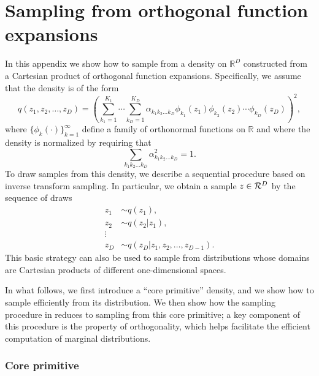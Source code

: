 
%

\section{Sampling from orthogonal function expansions}
\label{app:sampling}

In this appendix we show how to sample from a density on $\mathbb{R}^D$ constructed from a Cartesian product of orthogonal function expansions. Specifically, we assume that the density is of the form
\begin{equation}
    q(z_1,z_2,\ldots,z_D) = \left(\sum_{k_1=1}^{K_1} \cdots \sum_{k_D=1}^{K_D} \alpha_{k_1 k_2 \ldots k_D}\phi_{k_1}(z_1)\phi_{k_2}(z_2)\cdots\phi_{k_D}(z_D)\right)^2,
\end{equation}
where $\{\phi_{k}(\cdot)\}_{k=1}^\infty$ define a family of orthonormal functions on $\mathbb{R}$ and where the density is normalized by requiring that
\begin{equation}
\sum_{k_1 k_2\ldots k_D} \alpha_{k_1 k_2\ldots k_D}^2=1.
\end{equation}
To draw samples from this density, we describe a sequential procedure based on inverse transform sampling. In particular, we obtain a sample $z\in\mathcal{R}^D$ by the sequence of draws
\begin{align}
\label{eq:draw1}
z_1 & \sim  q(z_1),  \\
z_2 & \sim  q(z_2|z_1), \\
    \vdots & \qquad\quad \nonumber  \\
\label{eq:drawD}
z_D & \sim  q(z_D|z_1,z_2,\ldots,z_{D-1}).
\end{align}
This basic strategy can also be used to sample from distributions whose domains are Cartesian products of different one-dimensional spaces.

In what follows, we first introduce a ``core primitive'' density,
    and we show how to sample efficiently from its distribution.
    We then show how the sampling procedure in 
    reduces to sampling from this core primitive; a key component of this procedure
    is the property of orthogonality, which helps facilitate the efficient computation of
    marginal distributions.

\subsubsection*{Core primitive}


